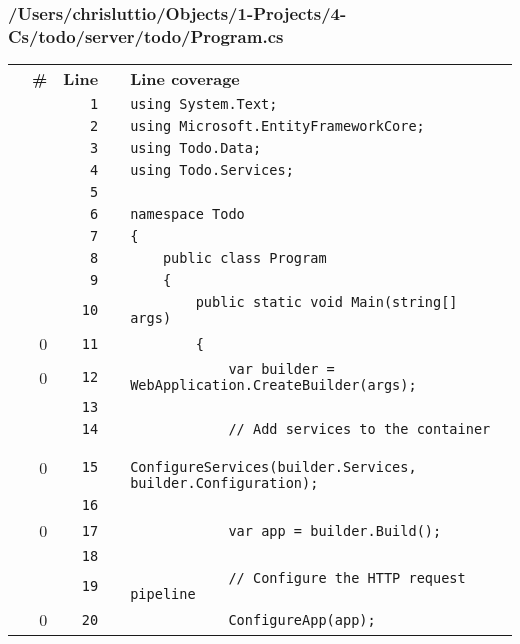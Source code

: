 \documentclass[a4paper,landscape,10pt]{article}
\begin{document}
\subsubsection{/Users/chrisluttio/Objects/1-Projects/4-Cs/todo/server/todo/Program.cs}
\begin{longtable}[l]{lrrll}
\textbf{} & \textbf{\#} & \textbf{Line} & \textbf{} & \textbf{Line coverage}\\
\cellcolor{gray} &  & \verb~1~ & & \verb~using System.Text;~\\
\cellcolor{gray} &  & \verb~2~ & & \verb~using Microsoft.EntityFrameworkCore;~\\
\cellcolor{gray} &  & \verb~3~ & & \verb~using Todo.Data;~\\
\cellcolor{gray} &  & \verb~4~ & & \verb~using Todo.Services;~\\
\cellcolor{gray} &  & \verb~5~ & & \verb~~\\
\cellcolor{gray} &  & \verb~6~ & & \verb~namespace Todo~\\
\cellcolor{gray} &  & \verb~7~ & & \verb~{~\\
\cellcolor{gray} &  & \verb~8~ & & \verb~    public class Program~\\
\cellcolor{gray} &  & \verb~9~ & & \verb~    {~\\
\cellcolor{gray} &  & \verb~10~ & & \verb~        public static void Main(string[] args)~\\
\cellcolor{red} & 0 & \verb~11~ & & \verb~        {~\\
\cellcolor{red} & 0 & \verb~12~ & & \verb~            var builder = WebApplication.CreateBuilder(args);~\\
\cellcolor{gray} &  & \verb~13~ & & \verb~~\\
\cellcolor{gray} &  & \verb~14~ & & \verb~            // Add services to the container~\\
\cellcolor{red} & 0 & \verb~15~ & & \verb~            ConfigureServices(builder.Services, builder.Configuration);~\\
\cellcolor{gray} &  & \verb~16~ & & \verb~~\\
\cellcolor{red} & 0 & \verb~17~ & & \verb~            var app = builder.Build();~\\
\cellcolor{gray} &  & \verb~18~ & & \verb~~\\
\cellcolor{gray} &  & \verb~19~ & & \verb~            // Configure the HTTP request pipeline~\\
\cellcolor{red} & 0 & \verb~20~ & & \verb~            ConfigureApp(app);~\\

\end{longtable}
\end{document}
